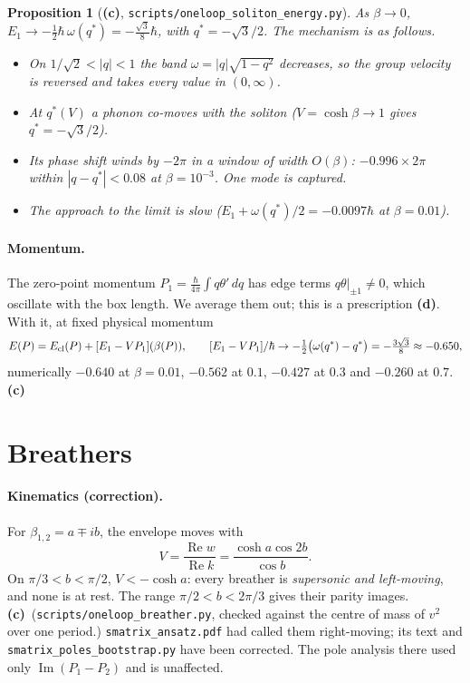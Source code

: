 \documentclass[11pt,a4paper]{article}
\newcommand{\Lc}{\textsf{\textbf{(c)}}}
\newcommand{\Ld}{\textsf{\textbf{(d)}}}
\newcommand{\script}[1]{\texttt{scripts/#1}}
\newtheorem{proposition}{Proposition}[section]
\theoremstyle{remark}\newtheorem{remark}[proposition]{Remark}
\begin{document}
\begin{proposition}[\Lc, \script{oneloop\_soliton\_energy.py}]\label{prop:res}
As $\beta\to0$, $E_1\to-\tfrac12\hbar\,\omega(q^*)=-\tfrac{\sqrt3}{8}\hbar$, with $q^*=-\sqrt3/2$. The mechanism is as follows.
\begin{itemize}
\item On $1/\sqrt2<|q|<1$ the band $\omega=|q|\sqrt{1-q^2}$ \emph{decreases}, so the group velocity is reversed and takes every value in $(0,\infty)$.
\item At $q^*(V)$ a phonon co-moves with the soliton ($V=\cosh\beta\to1$ gives $q^*=-\sqrt3/2$).
\item Its phase shift winds by $-2\pi$ in a window of width $O(\beta)$: $-0.996\times2\pi$ within $|q-q^*|<0.08$ at $\beta=10^{-3}$. One mode is captured.
\item The approach to the limit is slow ($E_1+\omega(q^*)/2=-0.0097\hbar$ at $\beta=0.01$).
\end{itemize}
\end{proposition}

\paragraph{Momentum.} The zero-point momentum $P_1=\frac{\hbar}{4\pi}\int q\theta'\,dq$ has edge terms $q\theta|_{\pm1}\neq0$, which oscillate with the box length. We average them out; this is a prescription \Ld. With it, at fixed physical momentum
\[
E(P)=E_{\rm cl}(P)+[E_1-VP_1](\beta(P)),\qquad [E_1-VP_1]/\hbar\to-\tfrac12\big(\omega(q^*)-q^*\big)=-\tfrac{3\sqrt3}{8}\approx-0.650,
\]
numerically $-0.640$ at $\beta=0.01$, $-0.562$ at $0.1$, $-0.427$ at $0.3$ and $-0.260$ at $0.7$. \Lc

\section{Breathers}
\paragraph{Kinematics (correction).} For $\beta_{1,2}=a\mp ib$, the envelope moves with
\[
V=\frac{\operatorname{Re}w}{\operatorname{Re}k}=\frac{\cosh a\cos2b}{\cos b}.
\]
On $\pi/3<b<\pi/2$, $V<-\cosh a$: every breather is \emph{supersonic and left-moving}, and none is at rest. The range $\pi/2<b<2\pi/3$ gives their parity images. \Lc\ (\script{oneloop\_breather.py}, checked against the centre of mass of $v^2$ over one period.) \texttt{smatrix\_ansatz.pdf} had called them right-moving; its text and \texttt{smatrix\_poles\_bootstrap.py} have been corrected. The pole analysis there used only $\operatorname{Im}(P_1-P_2)$ and is unaffected.
\end{document}
